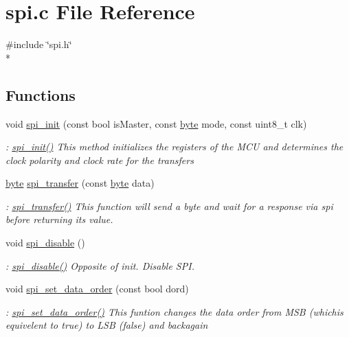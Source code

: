\hypertarget{a00014}{\section{spi.\-c File Reference}
\label{a00014}
}
{\ttfamily \#include \char`\"{}spi.\-h\char`\"{}}\\*
\subsection*{Functions}
\begin{DoxyCompactItemize}
\item 
void \hyperlink{a00014_a94087004a94105cf6d70f8ea90af2408}{spi\-\_\-init} (const bool is\-Master, const \hyperlink{a00011_a82b52bf2b45e214a8f2100ebfdf1aee4}{byte} mode, const uint8\-\_\-t clk)
\begin{DoxyCompactList}\small\item\em \-: \hyperlink{a00015_a94087004a94105cf6d70f8ea90af2408}{spi\-\_\-init()} This method initializes the registers of the M\-C\-U and determines the clock polarity and clock rate for the transfers \end{DoxyCompactList}\item 
\hyperlink{a00011_a82b52bf2b45e214a8f2100ebfdf1aee4}{byte} \hyperlink{a00014_aab1ad15333780e6b9f8c8be602682818}{spi\-\_\-transfer} (const \hyperlink{a00011_a82b52bf2b45e214a8f2100ebfdf1aee4}{byte} data)
\begin{DoxyCompactList}\small\item\em \-: \hyperlink{a00015_aab1ad15333780e6b9f8c8be602682818}{spi\-\_\-transfer()} This function will send a byte and wait for a response via spi before returning its value. \end{DoxyCompactList}\item 
void \hyperlink{a00014_a1b20de0da423e7d6da1c99eec9d63216}{spi\-\_\-disable} ()
\begin{DoxyCompactList}\small\item\em \-: \hyperlink{a00015_a1b20de0da423e7d6da1c99eec9d63216}{spi\-\_\-disable()} Opposite of init. Disable S\-P\-I. \end{DoxyCompactList}\item 
void \hyperlink{a00014_a5d5bcfa359b4591e38b5d533d624216e}{spi\-\_\-set\-\_\-data\-\_\-order} (const bool dord)
\begin{DoxyCompactList}\small\item\em \-: \hyperlink{a00015_a5d5bcfa359b4591e38b5d533d624216e}{spi\-\_\-set\-\_\-data\-\_\-order()} This funtion changes the data order from M\-S\-B (whichis equivelent to true) to L\-S\-B (false) and backagain \end{DoxyCompactList}\item 

\end{DoxyCompactItemize}
